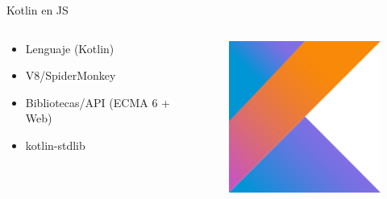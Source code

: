 \documentclass[aspectratio=169]{beamer}
\begin{document}
\begin{frame}[fragile]{Kotlin en JS}
    
    \begin{columns}
        \begin{column}{0.5\textwidth}
            \begin{itemize}
                \item Lenguaje (Kotlin)
                \item V8/SpiderMonkey
                \item Bibliotecas/API (ECMA 6 + Web)
                \item kotlin-stdlib
            \end{itemize}
        \end{column}
        \begin{column}{0.5\textwidth}  %
            \begin{figure}
                \centering
                \includegraphics[width=0.4\linewidth]{Images/kotlin}
            \end{figure}
        \end{column}
    \end{columns}
\end{frame}
\end{document}
